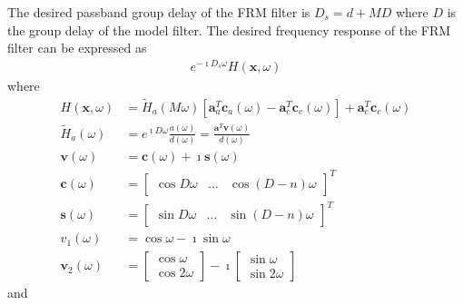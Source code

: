 \documentclass[a4paper,twoside,10pt,english]{report}
\begin{document}
The desired passband group delay of the FRM filter is $D_{s}=d+MD$
where $D$ is the group delay of the model filter. The desired frequency
response of the FRM filter can be expressed as
\begin{align*}
e^{-\imath D_{s} \omega}H\left(\boldsymbol{x},\omega\right)
\end{align*}
where
\begin{align*}
H\left(\boldsymbol{x},\omega\right) &= \tilde{H}_{a}\left(M\omega\right)
\left[\boldsymbol{a}_{a}^{T}\boldsymbol{c}_{a}\left(\omega\right)-
\boldsymbol{a}_{c}^{T}\boldsymbol{c}_{c}\left(\omega\right)\right]+
\boldsymbol{a}_{c}^{T}\boldsymbol{c}_{c}\left(\omega\right)\\
\tilde{H}_{a}\left(\omega\right) &= e^{\imath D\omega}
\frac{a\left(\omega\right)}{d\left(\omega\right)} = 
\frac{\boldsymbol{a}^{T}\boldsymbol{v}\left(\omega\right)}
{d\left(\omega\right)}\\
\boldsymbol{v}\left(\omega\right) &= 
\boldsymbol{c}\left(\omega\right) + \imath\boldsymbol{s}\left(\omega\right)\\ 
\boldsymbol{c}\left(\omega\right) &= \left[\begin{array}{ccc}
\cos D\omega & \hdots & \cos \left(D-n\right)\omega
\end{array}\right]^{T}\\
\boldsymbol{s}\left(\omega\right) &= \left[\begin{array}{ccc}
\sin D\omega & \hdots & \sin \left(D-n\right)\omega
\end{array}\right]^{T}\\
v_{1}\left(\omega\right) &= \cos \omega - \imath \sin\omega \\
\boldsymbol{v}_{2}\left(\omega\right) &= \left[\begin{array}{c}
\cos \omega\\
\cos 2\omega
\end{array}\right]-\imath\left[\begin{array}{c}
\sin \omega\\
\sin 2\omega
\end{array}\right]
\end{align*}
and
\end{document}
